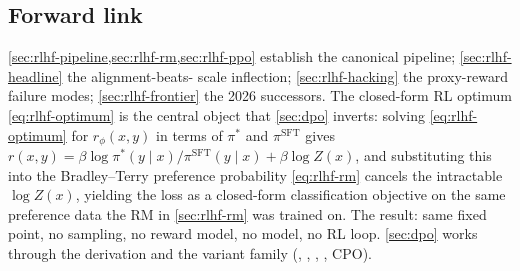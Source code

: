 \subsection{Forward link}
\label{sec:rlhf-forward}

\cref{sec:rlhf-pipeline,sec:rlhf-rm,sec:rlhf-ppo} establish the
canonical  pipeline; \cref{sec:rlhf-headline} the alignment-beats-
scale inflection; \cref{sec:rlhf-hacking} the proxy-reward failure
modes; \cref{sec:rlhf-frontier} the 2026 successors. The closed-form
RL optimum \cref{eq:rlhf-optimum} is the central object that
\cref{sec:dpo} inverts: solving \cref{eq:rlhf-optimum} for
$r_\phi(x, y)$ in terms of $\pi^*$ and $\pi^{\mathrm{SFT}}$ gives
$r(x, y) = \beta \log \pi^*(y \mid x) / \pi^{\mathrm{SFT}}(y \mid x) +
\beta \log Z(x)$, and substituting this into the Bradley--Terry
preference probability \cref{eq:rlhf-rm} cancels the intractable
$\log Z(x)$, yielding the  loss as a closed-form classification
objective on the same preference data the RM in \cref{sec:rlhf-rm}
was trained on. The result: same fixed point, no sampling, no reward
model, no  model, no RL loop. \cref{sec:dpo} works through the
derivation and the variant family (, , , , CPO).
